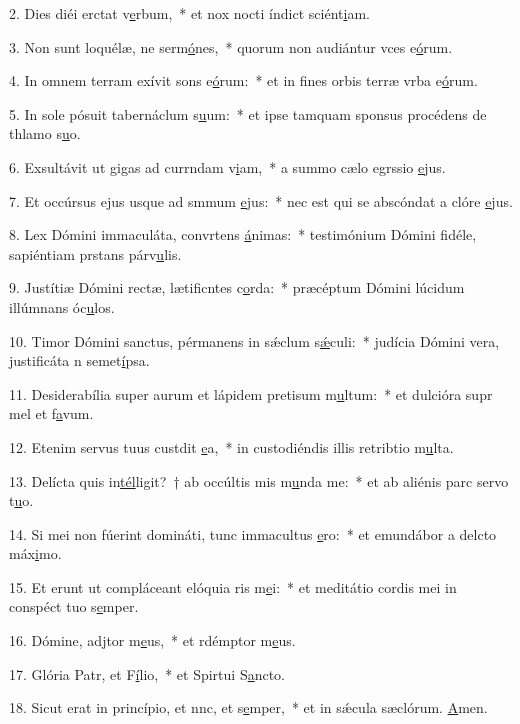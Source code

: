 2. Dies diéi erctat v\uline{e}rbum,~* et nox nocti índict sciént\uline{i}am.\par 
3. Non sunt loquélæ, ne serm\uline{ó}nes,~* quorum non audiántur vces e\uline{ó}rum.\par 
4. In omnem terram exívit sons e\uline{ó}rum:~* et in fines orbis terræ vrba e\uline{ó}rum.\par 
5. In sole pósuit tabernáclum s\uline{u}um:~* et ipse tamquam sponsus procédens de thlamo s\uline{u}o.\par 
6. Exsultávit ut gigas ad currndam v\uline{i}am,~* a summo cælo egrssio \uline{e}jus.\par 
7. Et occúrsus ejus usque ad smmum \uline{e}jus:~* nec est qui se abscóndat a clóre \uline{e}jus.\par 
8. Lex Dómini immaculáta, convrtens \uline{á}nimas:~* testimónium Dómini fidéle, sapiéntiam prstans párv\uline{u}lis.\par 
9. Justítiæ Dómini rectæ, lætificntes c\uline{o}rda:~* præcéptum Dómini lúcidum illúmnans óc\uline{u}los.\par 
10. Timor Dómini sanctus, pérmanens in sǽclum s\uline{ǽ}culi:~* judícia Dómini vera, justificáta n semet\uline{í}psa.\par 
11. Desiderabília super aurum et lápidem pretisum m\uline{u}ltum:~* et dulcióra supr mel et f\uline{a}vum.\par 
12. Etenim servus tuus custdit \uline{e}a,~* in custodiéndis illis retribtio m\uline{u}lta.\par 
13. Delícta quis in\uline{tél}ligit?~† ab occúltis mis m\uline{u}nda me:~* et ab aliénis parc servo t\uline{u}o.\par 
14. Si mei non fúerint domináti, tunc immacultus \uline{e}ro:~* et emundábor a delcto máx\uline{i}mo.\par 
15. Et erunt ut compláceant elóquia ris m\uline{e}i:~* et meditátio cordis mei in conspéct tuo s\uline{e}mper.\par 
16. Dómine, adjtor m\uline{e}us,~* et rdémptor m\uline{e}us.\par 
17. Glória Patr, et F\uline{í}lio,~* et Spirtui S\uline{a}ncto.\par 
18. Sicut erat in princípio, et nnc, et s\uline{e}mper,~* et in sǽcula sæclórum. \uline{A}men.\par 

